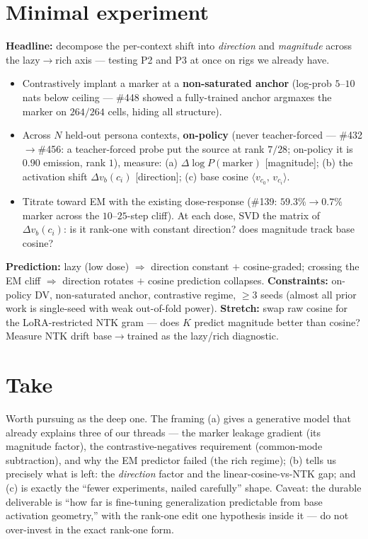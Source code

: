 \documentclass[11pt]{article}
\newcommand{\ip}[2]{\langle #1,\, #2\rangle}
\begin{document}
\section*{Minimal experiment}

\textbf{Headline:} decompose the per-context shift into \emph{direction} and
\emph{magnitude} across the lazy$\to$rich axis --- testing P2 and P3 at once on rigs we
already have.

\begin{itemize}[leftmargin=1.4em]
  \item Contrastively implant a marker at a \textbf{non-saturated anchor} (log-prob
  $5\text{–}10$ nats below ceiling --- \#448 showed a fully-trained anchor argmaxes the
  marker on $264/264$ cells, hiding all structure).
  \item Across $N$ held-out persona contexts, \textbf{on-policy} (never teacher-forced ---
  \#432$\to$\#456: a teacher-forced probe put the source at rank $7/28$; on-policy it is
  $0.90$ emission, rank $1$), measure: (a) $\Delta\log P(\text{marker})$ [magnitude];
  (b) the activation shift $\Delta v_b(c_i)$ [direction]; (c) base cosine
  $\ip{v_{c_0}}{v_{c_i}}$.
  \item Titrate toward EM with the existing dose-response (\#139: $59.3\%\!\to\!0.7\%$
  marker across the $10\text{–}25$-step cliff). At each dose, SVD the matrix of
  $\Delta v_b(c_i)$: is it rank-one with constant direction? does magnitude track base
  cosine?
\end{itemize}
\textbf{Prediction:} lazy (low dose) $\Rightarrow$ direction constant $+$ cosine-graded;
crossing the EM cliff $\Rightarrow$ direction rotates $+$ cosine prediction collapses.
\textbf{Constraints:} on-policy DV, non-saturated anchor, contrastive regime, $\geq 3$
seeds (almost all prior work is single-seed with weak out-of-fold power).
\textbf{Stretch:} swap raw cosine for the LoRA-restricted NTK gram --- does $K$ predict
magnitude better than cosine? Measure NTK drift base$\to$trained as the lazy/rich
diagnostic.

\section*{Take}

Worth pursuing as the deep one. The framing (a) gives a generative model that already
explains three of our threads --- the marker leakage gradient (its magnitude factor), the
contrastive-negatives requirement (common-mode subtraction), and why the EM predictor
failed (the rich regime); (b) tells us precisely what is left: the \emph{direction}
factor and the linear-cosine-vs-NTK gap; and (c) is exactly the ``fewer experiments,
nailed carefully'' shape. Caveat: the durable deliverable is ``how far is fine-tuning
generalization predictable from base activation geometry,'' with the rank-one edit one
hypothesis inside it --- do not over-invest in the exact rank-one form.
\end{document}
